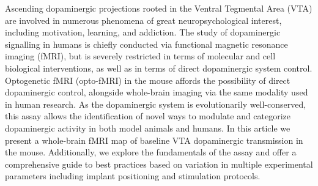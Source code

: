 Ascending dopaminergic projections rooted in the Ventral Tegmental Area (VTA) are involved in numerous phenomena of great neuropsychological interest, including motivation, learning, and addiction.
The study of dopaminergic signalling in humans is chiefly conducted via functional magnetic resonance imaging (fMRI), but is severely restricted in terms of molecular and cell biological interventions, as well as in terms of direct dopaminergic system control.
Optogenetic fMRI (opto-fMRI) in the mouse affords the possibility of direct dopaminergic control, alongside whole-brain imaging via the same modality used in human research.
As the dopaminergic system is evolutionarily well-conserved, this assay allows the identification of novel ways to modulate and categorize dopaminergic activity in both model animals and humans.
In this article we present a whole-brain fMRI map of baseline VTA dopaminergic transmission in the mouse.
Additionally, we explore the fundamentals of the assay and offer a comprehensive guide to best practices based on variation in multiple experimental parameters including implant positioning and stimulation protocols.
